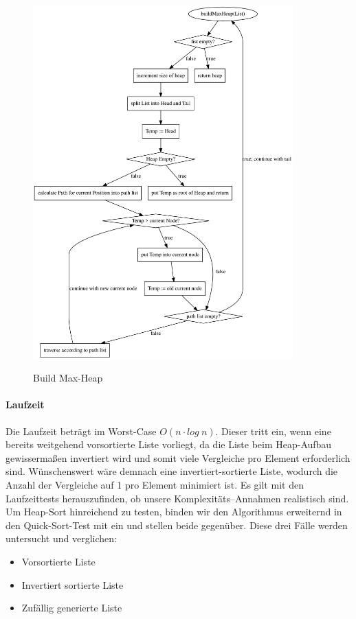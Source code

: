 \begin{figure}[hbt]
    \caption{Build Max-Heap}
    \centering
    \includegraphics[width = 10cm]{buildMaxHeap.pdf}\label{fig:buildMaxHeap}
\end{figure}

\paragraph{Laufzeit}\label{subsec:Hlaufzeit}
Die Laufzeit beträgt im Worst-Case \(O(n\cdot log\ n)\). Dieser tritt
ein, wenn eine bereits weitgehend vorsortierte Liste vorliegt, da die
Liste beim Heap-Aufbau gewissermaßen invertiert wird und somit viele
Vergleiche pro Element erforderlich sind.
Wünschenswert wäre demnach eine invertiert-sortierte Liste, wodurch die
Anzahl der Vergleiche auf 1 pro Element minimiert ist.
Es gilt mit den Laufzeittests herauszufinden, ob unsere
Komplexitäts--Annahmen realistisch sind.
Um Heap-Sort hinreichend zu testen, binden wir den Algorithmus erweiternd
in den Quick-Sort-Test mit ein und stellen beide gegenüber.
Diese drei Fälle werden untersucht und verglichen:
\begin{samepage}
    \begin{itemize}
        \item Vorsortierte Liste
        \item Invertiert sortierte Liste
        \item Zufällig generierte Liste
    \end{itemize}
\end{samepage}
\FloatBarrier
